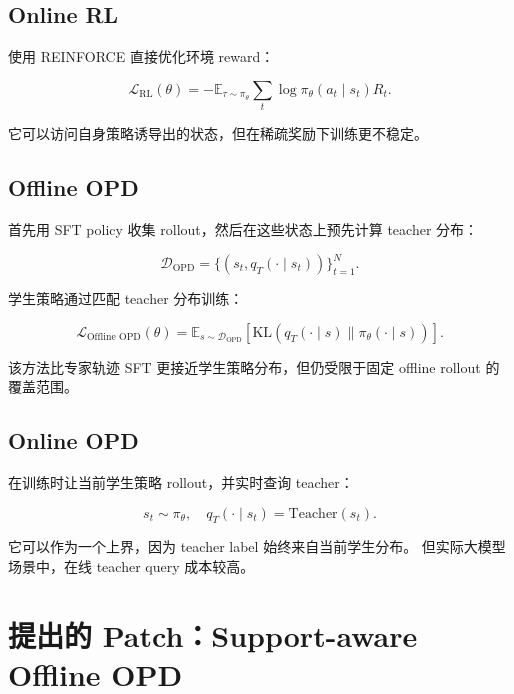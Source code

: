 \documentclass[11pt]{ctexart}
\begin{document}
\subsection{Online RL}

\onlinerl{} 使用 REINFORCE 直接优化环境 reward：

\begin{equation}
\mathcal{L}_{\text{RL}}(\theta)
=
-\mathbb{E}_{\tau \sim \pi_\theta}
\sum_t \log \pi_\theta(a_t \mid s_t) R_t.
\end{equation}

它可以访问自身策略诱导出的状态，但在稀疏奖励下训练更不稳定。

\subsection{Offline OPD}

\offlineopd{} 首先用 SFT policy 收集 rollout，然后在这些状态上预先计算 teacher 分布：

\begin{equation}
\mathcal{D}_{\text{OPD}}
=
\{(s_t, q_T(\cdot \mid s_t))\}_{t=1}^{N}.
\end{equation}

学生策略通过匹配 teacher 分布训练：

\begin{equation}
\mathcal{L}_{\text{Offline OPD}}(\theta)
=
\mathbb{E}_{s \sim \mathcal{D}_{\text{OPD}}}
\left[
\mathrm{KL}
\left(
q_T(\cdot \mid s)
\parallel
\pi_\theta(\cdot \mid s)
\right)
\right].
\end{equation}

该方法比专家轨迹 SFT 更接近学生策略分布，但仍受限于固定 offline rollout 的覆盖范围。

\subsection{Online OPD}

\onlineopd{} 在训练时让当前学生策略 rollout，并实时查询 teacher：

\begin{equation}
s_t \sim \pi_\theta,
\quad
q_T(\cdot \mid s_t) = \mathrm{Teacher}(s_t).
\end{equation}

它可以作为一个上界，因为 teacher label 始终来自当前学生分布。
但实际大模型场景中，在线 teacher query 成本较高。

\section{提出的 Patch：Support-aware Offline OPD}
\end{document}

